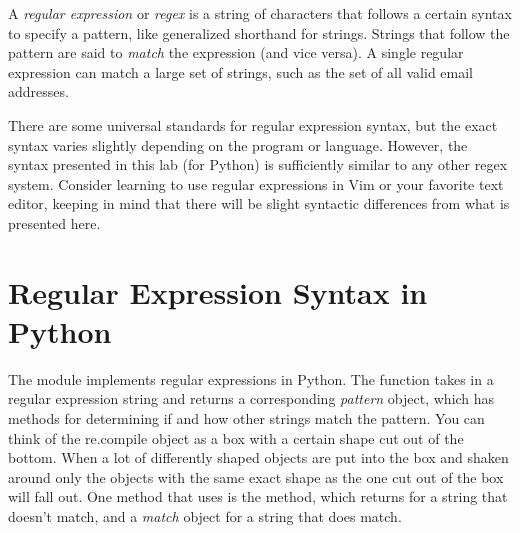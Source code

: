 

A \emph{regular expression} or \emph{regex} is a string of characters that follows a certain syntax to specify a pattern, like generalized shorthand for strings.
Strings that follow the pattern are said to \emph{match} the expression (and vice versa).
A single regular expression can match a large set of strings, such as the set of all valid email addresses.

\begin{warn}
There are some universal standards for regular expression syntax, but the exact syntax varies slightly depending on the program or language.
However, the syntax presented in this lab (for Python) is sufficiently similar to any other regex system.
Consider learning to use regular expressions in Vim or your favorite text editor, keeping in mind that there will be slight syntactic differences from what is presented here.
\end{warn}

\section*{Regular Expression Syntax in Python} %

The  module implements regular expressions in Python.
The function  takes in a regular expression string and returns a corresponding \emph{pattern} object, which has methods for determining if and how other strings match the pattern. You can think of the re.compile object as a box with a certain shape cut out of the bottom. When a lot of differently shaped objects are put into the box and shaken around only the objects with the same exact shape as the one cut out of the box will fall out. One method that  uses is the  method, which returns  for a string that doesn't match, and a \emph{match} object for a string that does match.

